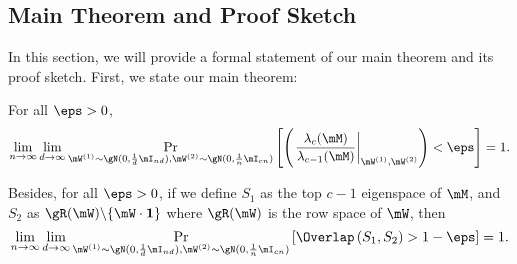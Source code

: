 \subsection{Main Theorem and Proof Sketch}
\label{proof-sketch}

In this section, we will provide a formal statement of our main theorem and its proof sketch. First, we state our main theorem:
\begin{theorem}
\label{main-thm}

For all $\eps > 0$,
\begin{equation}
    \lim_{n\to\infty}\lim_{d\to \infty}\mathop{\Pr}_{\mW^{(1)}\sim\gN(0,\frac{1}{d}\mI_{nd}), \mW^{(2)}\sim\gN(0,\frac{1}{n}\mI_{cn})}\left[\left(\left.\frac{\lambda_c(\mM)}{\lambda_{c-1}(\mM)}\right|_{\mW^{(1)}, \mW^{(2)}}\right) < \eps\right] = 1.
\end{equation}

Besides, for all $\eps>0$, if we define $S_1$ as the top $c-1$ eigenspace of $\mM$, and $S_2$ as $\gR(\mW)\backslash\{\mW\cdot\textbf{1}\}$ where $\gR(\mW)$ is the row space of $\mW$, then
\begin{equation}
    \lim_{n\to\infty}\lim_{d\to \infty}\mathop{\Pr}_{\mW^{(1)}\sim\gN(0,\frac{1}{d}\mI_{nd}), \mW^{(2)}\sim\gN(0,\frac{1}{n}\mI_{cn})}\left[\Overlap\left(S_1,S_2\right)>1-\eps\right] = 1.
\end{equation}

\end{theorem}
